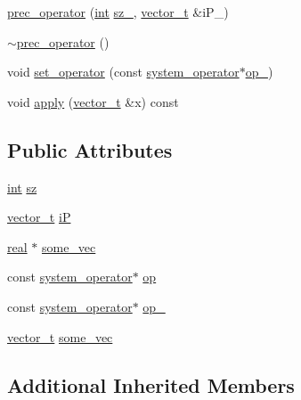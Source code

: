 \begin{DoxyCompactItemize}
\hyperlink{structprec__operator_aea4415d0b7b3e7c5a919e14b36f568f6}{prec\-\_\-operator} (\hyperlink{classint}{int} \hyperlink{structcpu__vector__operations_a2a4bf62b86d243cb5fba381dda5c1e3d}{sz\-\_\-}, \hyperlink{linear__solvers__test_8cpp_a8d0acf9490f363fba134e7c88d751014}{vector\-\_\-t} \&i\-P\-\_\-)
\item 
\hyperlink{structprec__operator_a49b071af3896a71655fc7f0a8d67ac5d}{$\sim$prec\-\_\-operator} ()
\item 
void \hyperlink{structprec__operator_a133650134415463a904a57fd09bd166e}{set\-\_\-operator} (const \hyperlink{structsystem__operator}{system\-\_\-operator}$\ast$\hyperlink{structprec__operator_aca40061d71943ef2781bcfde64280dcf}{op\-\_\-})
\item 
void \hyperlink{structprec__operator_aa17c44dd36147d1967bdfc526bb424b1}{apply} (\hyperlink{linear__solvers__test_8cpp_a8d0acf9490f363fba134e7c88d751014}{vector\-\_\-t} \&x) const 
\end{DoxyCompactItemize}
\subsection*{Public Attributes}
\begin{DoxyCompactItemize}
\item 
\hyperlink{classint}{int} \hyperlink{structprec__operator_ac24790c11be0bdc90953e351804950cf}{sz}
\item 
\hyperlink{linear__solvers__test_8cpp_a8d0acf9490f363fba134e7c88d751014}{vector\-\_\-t} \hyperlink{structprec__operator_ae630f00099683269fd18fae92a48c48b}{i\-P}
\item 
\hyperlink{linear__solvers__test_8cpp_a16870095f424ead722dee97d866cc328}{real} $\ast$ \hyperlink{structprec__operator_ab32cd5dd6334438c3971d5368067fa25}{some\-\_\-vec}
\item 
const \hyperlink{structsystem__operator}{system\-\_\-operator}$\ast$ \hyperlink{structprec__operator_af1130a19572d81a4283cf942defc9e32}{op}
\item 
const \hyperlink{structsystem__operator}{system\-\_\-operator}$\ast$ \hyperlink{structprec__operator_aca40061d71943ef2781bcfde64280dcf}{op\-\_\-}
\item 
\hyperlink{linear__solvers__test_8cpp_a8d0acf9490f363fba134e7c88d751014}{vector\-\_\-t} \hyperlink{structprec__operator_ad54c0c92bf70fa19d1aa97cf92df5a76}{some\-\_\-vec}
\end{DoxyCompactItemize}
\subsection*{Additional Inherited Members}


